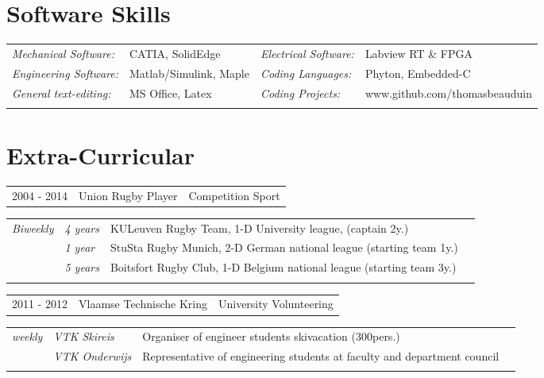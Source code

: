 \documentclass[a4paper,10pt]{article}
\begin{document}
\section{Software Skills}
\begin{tabularx}{500pt}{llll}
\textit{Mechanical Software:} 	& CATIA, SolidEdge 		 
& \textit{Electrical Software:}   & Labview RT \& FPGA \\
\textit{Engineering Software:} 	& Matlab/Simulink, Maple 
& \textit{Coding Languages:} & Phyton, Embedded-C \\
\textit{General text-editing:} & MS Office, Latex 
& \textit{Coding Projects:} & www.github.com/thomasbeauduin \\
& & & \\
\end{tabularx}

\section{Extra-Curricular}
\begin{tabularx}{\textwidth}{cXr}     
\textsc{2004 - 2014} & Union Rugby Player & Competition Sport \\
\end{tabularx}
\begin{tabularx}{\textwidth}{clXr}
\textit{Biweekly}    & \textit{4 years} & KULeuven Rugby Team, 1-D University league, (captain 2y.) \\
\hspace{55pt} & \textit{1 year} & StuSta Rugby Munich, 2-D German national league (starting team 1y.)  \\
\hspace{55pt} & \textit{5 years} & Boitsfort Rugby Club, 1-D Belgium national league (starting team 3y.)  \\
\\
\end{tabularx}

\begin{tabularx}{\textwidth}{cXr}     
\textsc{2011 - 2012} & Vlaamse Technische Kring & University Volunteering \\
\end{tabularx}
\begin{tabularx}{\textwidth}{clXr}
\textit{weekly} & \textit{VTK Skireis} & Organiser of engineer students skivacation (300pers.)  \\
\hspace{55pt} & \textit{VTK Onderwijs} & Representative of engineering students at faculty and department council \\
\\
\end{tabularx}
\end{document}
